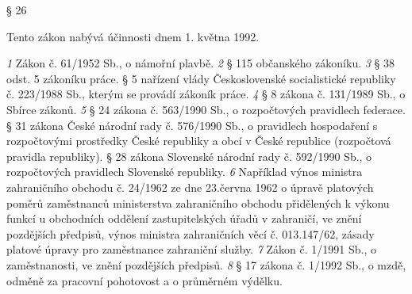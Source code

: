 \documentclass[11pt,a4paper]{article}
\begin{document}
§ 26

Tento zákon nabývá účinnosti dnem 1. května 1992.

\textit{1} Zákon č. 61/1952 Sb., o námořní plavbě. \textit{2} § 115 občanského zákoníku. \textit{3} § 38 odst. 5 zákoníku práce. § 5 nařízení vlády Československé socialistické republiky č. 223/1988 Sb., kterým se provádí zákoník práce. \textit{4} § 8 zákona č. 131/1989 Sb., o Sbírce zákonů. \textit{5} § 24 zákona č. 563/1990 Sb., o rozpočtových pravidlech federace. § 31 zákona České národní rady č. 576/1990 Sb., o pravidlech hospodaření s rozpočtovými prostředky České republiky a obcí v České republice (rozpočtová pravidla republiky). § 28 zákona Slovenské národní rady č. 592/1990 Sb., o rozpočtových pravidlech Slovenské republiky. \textit{6} Například výnos ministra zahraničního obchodu č. 24/1962 ze dne 23.června 1962 o úpravě platových poměrů zaměstnanců ministerstva zahraničního obchodu přidělených k výkonu funkcí u obchodních oddělení zastupitelských úřadů v zahraničí, ve znění pozdějších předpisů, výnos ministra zahraničních věcí č. 013.147/62, zásady platové úpravy pro zaměstnance zahraniční služby. \textit{7} Zákon č. 1/1991 Sb., o zaměstnanosti, ve znění pozdějších předpisů. \textit{8} § 17 zákona č. 1/1992 Sb., o mzdě, odměně za pracovní pohotovost a o průměrném výdělku.
\end{document}
